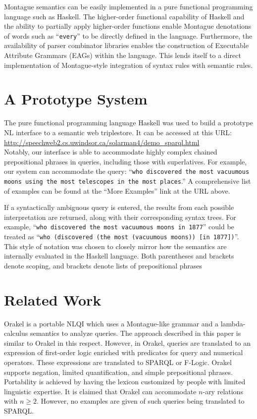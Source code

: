 \documentclass[../main.tex]{subfiles}
\begin{document}
\begin{refsection}
Montague semantics can be easily implemented in a pure functional programming language such as
Haskell. The higher-order functional capability of Haskell and the ability to partially apply higher-order functions enable Montague denotations of words such as ``\texttt{every}'' to be directly defined in the language. Furthermore, the availability of
parser combinator libraries enables the construction of Executable Attribute Grammars (EAGs) within the language.
This lends itself to a direct implementation of Montague-style integration of syntax rules with semantic rules.

\section{A Prototype System}
\label{icsc2020conf:prot}

The pure functional programming language Haskell was used to build a prototype NL interface to a
semantic web triplestore.  It can be accessed at this URL: \\

{\small \url{http://speechweb2.cs.uwindsor.ca/solarman4/demo_sparql.html}} \\

\noindent Notably, our interface is able to accommodate highly complex chained prepositional phrases in queries, including those with superlatives.
For example, our system can accommodate the query: ``\texttt{who discovered the most vacuumous moons using the most telescopes in the most places}.''  A comprehensive list of examples can be found at the ``More Examples'' link at the URL above.

If a syntactically ambiguous query is entered, the results from each possible interpretation are returned, along with their corresponding syntax trees.
For example, ``\texttt{who discovered the most vacuumous moons in 1877}'' could be treated as ``\texttt{who (discovered (the most (vacuumous moons)) [in 1877])}''.  This style of notation was chosen to closely mirror how the semantics are internally evaluated in the Haskell language.  Both parentheses and brackets denote scoping, and brackets denote lists of prepositional phrases

\section{Related Work}
\label{icsc2020conf:relatedwork}
Orakel \cite{cimiano:haase} is a portable NLQI which uses a Montague-like grammar and a lambda-calculus semantics to analyze queries. The approach described in this paper is similar to Orakel in this respect. However, in Orakel, queries are translated to an expression of first-order logic enriched with predicates for query and numerical operators. These expressions are translated to SPARQL or F-Logic. Orakel supports negation, limited quantification, and simple prepositional phrases. Portability is achieved by having the lexicon customized by people with limited linguistic expertise. It is claimed that Orakel can accommodate $n$-ary relations with $n \geq 2$. However, no examples are given of such queries being translated to SPARQL.


\end{refsection}
\end{document}
